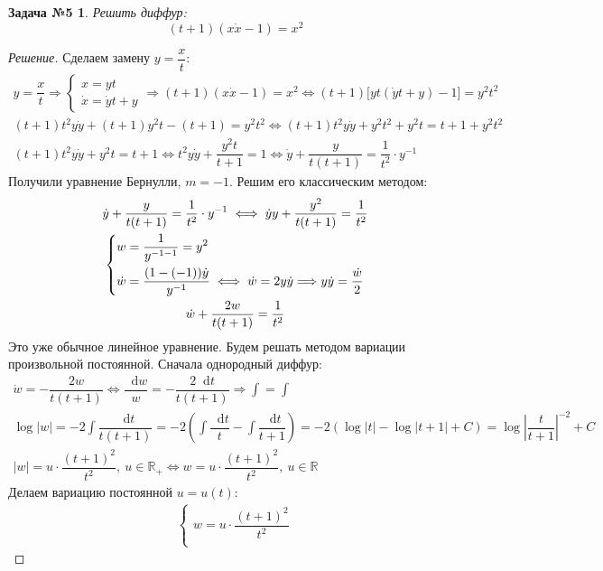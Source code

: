 \documentclass[a4paper,12pt]{article}
\newtheorem*{task5}{Задача №5}
\newcommand{\R}{\mathbb{R}}
\renewcommand*\d{\mathop{}\!\mathrm{d}}
\newcommand{\dy}{\dot{y}}
\newcommand{\dw}{\dot{w}}
\newcommand{\dx}{\dot{x}}
\newcommand{\bto}{\Longrightarrow}
\newcommand{\ds}{\displaystyle}
\begin{document}
\begin{task5}
	Решить диффур: \[(t + 1)(x\dx - 1) = x^2\]
\end{task5}
\begin{proof}[Решение]
	Сделаем замену $y = \dfrac{x}{t}$:
	\begin{gather*}
	y = \dfrac xt \bto
	\begin{cases}
	x = yt\\
	\dx = \dy t + y
	\end{cases} \bto (t + 1)(x\dx - 1) = x^2 \iff (t + 1)\big[yt(\dy t + y) - 1\big] = y^2t^2\\
	(t + 1)t^2y\dy + (t + 1)y^2t - (t + 1) = y^2t^2 \iff (t + 1)t^2y\dy + y^2t^2 + y^2t = t + 1 + y^2t^2\\
	(t + 1)t^2y\dy + y^2t = t + 1 \iff t^2y\dy + \dfrac{y^2t}{t + 1} = 1 \iff \dy + \dfrac{y}{t(t + 1)} = \dfrac{1}{t^2} \cdot y^{-1}
	\end{gather*}
	Получили уравнение Бернулли, $m = -1$. Решим его классическим методом:
	\begin{gather*}
	\dy + \dfrac{y}{t(t + 1)} = \dfrac{1}{t^2} \cdot y^{-1} \iff \dy y + \dfrac{y^2}{t(t + 1)} = \dfrac{1}{t^2}\\
	\left\{\begin{gathered}
	w = \dfrac{1}{y^{-1 -1}} = y^2\hfill\\
	\dw = \dfrac{(1 - (-1))\dy}{y^{-1}} \iff \dw = 2y\dy \bto y\dy = \dfrac{\dw}{2} \hfill
	\end{gathered}\right.\\
	\dw + \dfrac{2w}{t(t + 1)} = \dfrac{1}{t^2}
	\end{gather*}
	Это уже обычное линейное уравнение. Будем решать методом вариации произвольной постоянной. Сначала однородный диффур:
	\begin{gather*}
	\dw = -\dfrac{2w}{t(t + 1)} \iff \dfrac{\d w}{w} = -\dfrac{2\d t}{t(t + 1)} \bto \ds\int = \int\\
	\log|w| = -2\ds\int \dfrac{\d t}{t(t + 1)} = -2\left(\ds\int \dfrac{\d t}{t} - \ds\int \dfrac{\d t}{t + 1}\right) = -2\left( \log|t| - \log|t + 1| + C\right) = \log\left|\dfrac{t}{t + 1}\right|^{-2} + C\\
	|w| = u \cdot \dfrac{(t + 1)^2}{t^2},\ u \in \R_+ \iff w = u \cdot \dfrac{(t + 1)^2}{t^2},\ u \in \R
	\end{gather*}
	Делаем вариацию постоянной $u = u(t)$:
	\begin{gather*}
	\begin{cases}
	w = u \cdot \dfrac{(t + 1)^2}{t^2}\\

\end{cases}
\end{gather*}
\end{proof}
\end{document}

